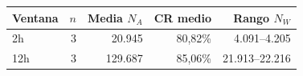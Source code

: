 \begin{tabular}{@{}lrrrr@{}}\hline
Ventana & $n$ & Media $N_A$ & CR medio & Rango $N_W$ \\ \hline
2h & 3 & 20.945 & 80,82\% & 4.091--4.205 \\
12h & 3 & 129.687 & 85,06\% & 21.913--22.216 \\
\hline\end{tabular}
